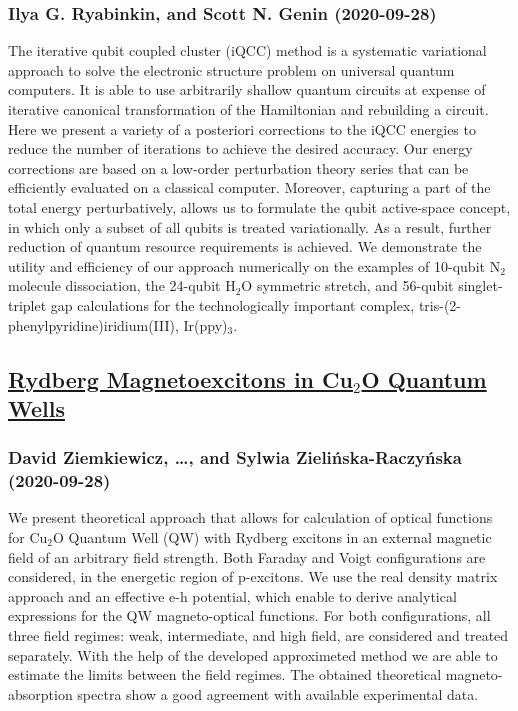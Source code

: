 \subsubsection*{Ilya G. Ryabinkin, and Scott N. Genin (2020-09-28)}
The iterative qubit coupled cluster (iQCC) method is a systematic variational
approach to solve the electronic structure problem on universal quantum
computers. It is able to use arbitrarily shallow quantum circuits at expense of
iterative canonical transformation of the Hamiltonian and rebuilding a circuit.
Here we present a variety of a posteriori corrections to the iQCC energies to
reduce the number of iterations to achieve the desired accuracy. Our energy
corrections are based on a low-order perturbation theory series that can be
efficiently evaluated on a classical computer. Moreover, capturing a part of
the total energy perturbatively, allows us to formulate the qubit active-space
concept, in which only a subset of all qubits is treated variationally. As a
result, further reduction of quantum resource requirements is achieved. We
demonstrate the utility and efficiency of our approach numerically on the
examples of 10-qubit N$_2$ molecule dissociation, the 24-qubit H$_2$O symmetric
stretch, and 56-qubit singlet-triplet gap calculations for the technologically
important complex, tris-(2-phenylpyridine)iridium(III), Ir(ppy)$_3$.

\subsection*{\href{http://arxiv.org/abs/2009.13621v1}{Rydberg Magnetoexcitons in Cu$_2$O Quantum Wells}}
\subsubsection*{David Ziemkiewicz, \dots, and Sylwia Zielińska-Raczyńska (2020-09-28)}
We present theoretical approach that allows for calculation of optical
functions for Cu$_2$O Quantum Well (QW) with Rydberg excitons in an external
magnetic field of an arbitrary field strength. Both Faraday and Voigt
configurations are considered, in the energetic region of p-excitons. We use
the real density matrix approach and an effective e-h potential, which enable
to derive analytical expressions for the QW magneto-optical functions. For both
configurations, all three field regimes: weak, intermediate, and high field,
are considered and treated separately. With the help of the developed
approximeted method we are able to estimate the limits between the field
regimes. The obtained theoretical magneto-absorption spectra show a good
agreement with available experimental data.

